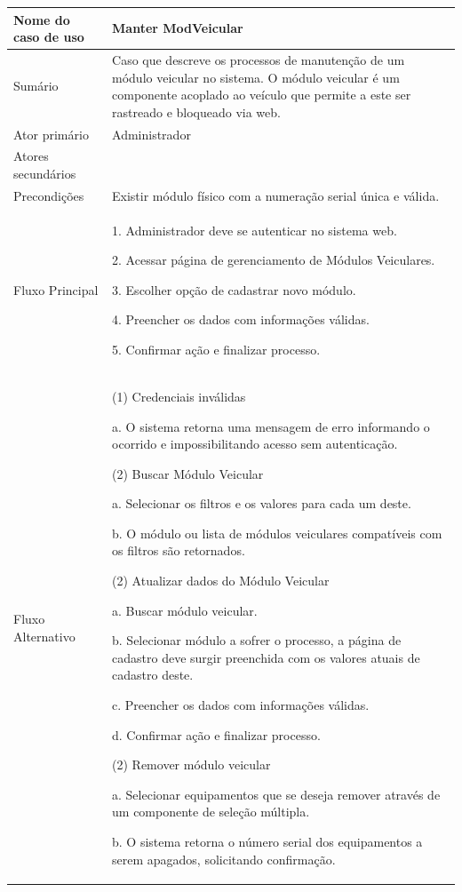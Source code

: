 \begin{flushleft}
\tablefirsthead{}
\tablehead{}
\tabletail{}
\tablelasttail{}
\begin{supertabular}{|m{5.5680003cm}|m{9.325cm}|}
\hline
Nome do caso de uso &
Manter ModVeicular\\\hline
Sumário &
Caso que descreve os processos de manutenção de um módulo veicular no sistema. O módulo veicular é um componente acoplado ao veículo que permite a este ser rastreado e bloqueado via web.\\\hline
Ator primário &
Administrador\\\hline
Atores secundários &
~
\\\hline
Precondições &
Existir módulo físico com a numeração serial única e válida.\\\hline
Fluxo Principal &
1. Administrador deve se autenticar no sistema web.

2. Acessar página de gerenciamento de Módulos Veiculares.

3. Escolher opção de cadastrar novo módulo.

4. Preencher os dados com informações válidas.

5. Confirmar ação e finalizar processo.\\\hline
Fluxo Alternativo &
(1) Credenciais inválidas

a. O sistema retorna uma mensagem de erro informando o ocorrido e impossibilitando acesso sem autenticação.

(2) Buscar Módulo Veicular

a. Selecionar os filtros e os valores para cada um deste.

b. O módulo ou lista de módulos veiculares compatíveis com os filtros são retornados.

(2) Atualizar dados do Módulo Veicular

a. Buscar módulo veicular.

b. Selecionar módulo a sofrer o processo, a página de cadastro deve surgir preenchida com os valores atuais de cadastro deste.

c. Preencher os dados com informações válidas.

d. Confirmar ação e finalizar processo.

(2) Remover módulo veicular

a. Selecionar equipamentos que se deseja remover através de um componente de seleção múltipla.

b. O sistema retorna o número serial dos equipamentos a serem apagados, solicitando confirmação.


\end{supertabular}
\end{flushleft}
